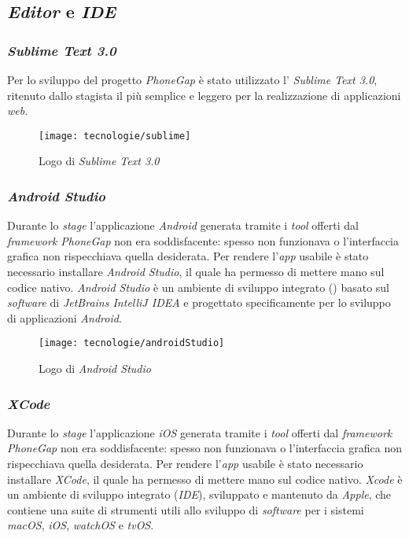 \subsection{\textit{Editor} e \textit{IDE}}

\subsubsection{\textit{Sublime Text 3.0}}

Per lo sviluppo del progetto \textit{PhoneGap} è stato utilizzato l' \textit{Sublime Text 3.0}, ritenuto dallo stagista il più semplice e leggero per la realizzazione di applicazioni \textit{web}. 

\begin{figure}[!h] 
    \centering 
    \texttt{[image: tecnologie/sublime]} 
    \caption{Logo di \textit{Sublime Text 3.0}}
\end{figure}

\subsubsection{\textit{Android Studio}}

Durante lo \textit{stage} l'applicazione \textit{Android} generata tramite i \textit{tool} offerti dal \textit{framework PhoneGap} non era soddisfacente: spesso non funzionava o l'interfaccia grafica non rispecchiava quella desiderata. Per rendere l'\textit{app} usabile è stato necessario installare \textit{Android Studio}, il quale ha permesso di mettere mano sul codice nativo. \textit{Android Studio} è un ambiente di sviluppo integrato () basato sul \textit{software} di \textit{JetBrains IntelliJ IDEA} e progettato specificamente per lo sviluppo di applicazioni \textit{Android}.

\begin{figure}[!h] 
    \centering 
    \texttt{[image: tecnologie/androidStudio]} 
    \caption{Logo di \textit{Android Studio}}
\end{figure}

\subsubsection{\textit{XCode}}

Durante lo \textit{stage} l'applicazione \textit{iOS} generata tramite i \textit{tool} offerti dal \textit{framework PhoneGap} non era soddisfacente: spesso non funzionava o l'interfaccia grafica non rispecchiava quella desiderata. Per rendere l'\textit{app} usabile è stato necessario installare \textit{XCode}, il quale ha permesso di mettere mano sul codice nativo. \textit{Xcode} è un ambiente di sviluppo integrato (\textit{IDE}), sviluppato e mantenuto da \textit{Apple}, che contiene una suite di strumenti utili allo sviluppo di \textit{software} per i sistemi \textit{macOS}, \textit{iOS}, \textit{watchOS} e \textit{tvOS}.

